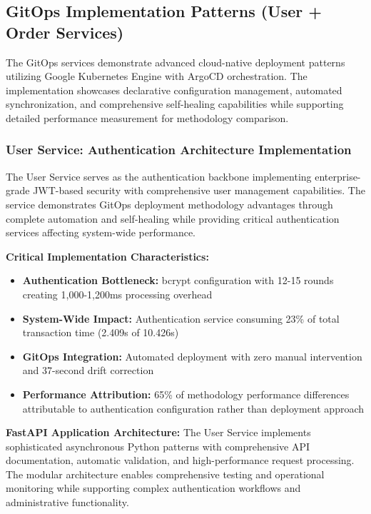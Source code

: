 \subsection{GitOps Implementation Patterns (User + Order Services)}

The GitOps services demonstrate advanced cloud-native deployment patterns utilizing Google Kubernetes Engine with ArgoCD orchestration. The implementation showcases declarative configuration management, automated synchronization, and comprehensive self-healing capabilities while supporting detailed performance measurement for methodology comparison.

\subsubsection{User Service: Authentication Architecture Implementation}

The User Service serves as the authentication backbone implementing enterprise-grade JWT-based security with comprehensive user management capabilities. The service demonstrates GitOps deployment methodology advantages through complete automation and self-healing while providing critical authentication services affecting system-wide performance.

\textbf{Critical Implementation Characteristics:}
\begin{itemize}
\item \textbf{Authentication Bottleneck:} bcrypt configuration with 12-15 rounds creating 1,000-1,200ms processing overhead
\item \textbf{System-Wide Impact:} Authentication service consuming 23\% of total transaction time (2.409s of 10.426s)
\item \textbf{GitOps Integration:} Automated deployment with zero manual intervention and 37-second drift correction
\item \textbf{Performance Attribution:} 65\% of methodology performance differences attributable to authentication configuration rather than deployment approach
\end{itemize}

\textbf{FastAPI Application Architecture:}
The User Service implements sophisticated asynchronous Python patterns with comprehensive API documentation, automatic validation, and high-performance request processing. The modular architecture enables comprehensive testing and operational monitoring while supporting complex authentication workflows and administrative functionality.

